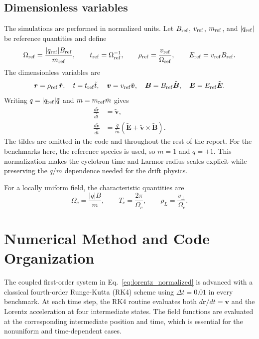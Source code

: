 \documentclass[11pt,a4paper]{article}
\newcommand{\vect}[1]{\boldsymbol{#1}}
\newcommand{\Ohm}{\Omega_c}
\newcommand{\rhL}{\rho_L}
\begin{document}
\subsection{Dimensionless variables}

The simulations are performed in normalized units. Let $B_{\rm ref}$, $v_{\rm ref}$, $m_{\rm ref}$, and $|q_{\rm ref}|$ be reference quantities and define
\begin{equation}
    \Omega_{\rm ref}=\frac{|q_{\rm ref}|B_{\rm ref}}{m_{\rm ref}},
    \qquad
    t_{\rm ref}=\Omega_{\rm ref}^{-1},
    \qquad
    \rho_{\rm ref}=\frac{v_{\rm ref}}{\Omega_{\rm ref}},
    \qquad
    E_{\rm ref}=v_{\rm ref}B_{\rm ref}.
\end{equation}
The dimensionless variables are
\begin{equation}
    \vect{r}=\rho_{\rm ref}\,\tilde{\vect{r}},\quad
    t=t_{\rm ref}\tilde t,\quad
    \vect{v}=v_{\rm ref}\tilde{\vect{v}},\quad
    \vect{B}=B_{\rm ref}\tilde{\vect{B}},\quad
    \vect{E}=E_{\rm ref}\tilde{\vect{E}}.
\end{equation}
Writing $q=|q_{\rm ref}|\tilde q$ and $m=m_{\rm ref}\tilde m$ gives
\begin{align}
    \frac{d\tilde{\vect{r}}}{d\tilde t} &= \tilde{\vect{v}},\\
    \frac{d\tilde{\vect{v}}}{d\tilde t}
    &=\frac{\tilde q}{\tilde m}
    \left(\tilde{\vect{E}}+\tilde{\vect{v}}\times\tilde{\vect{B}}\right).
    \label{eq:lorentz_normalized}
\end{align}
The tildes are omitted in the code and throughout the rest of the report. For the benchmarks here, the reference species is used, so $m=1$ and $q=+1$. This normalization makes the cyclotron time and Larmor-radius scales explicit while preserving the $q/m$ dependence needed for the drift physics.

For a locally uniform field, the characteristic quantities are
\begin{equation}
    \Ohm=\frac{|q|B}{m},
    \qquad
    T_c=\frac{2\pi}{\Ohm},
    \qquad
    \rhL=\frac{v_\perp}{\Ohm}.
\end{equation}

\section{Numerical Method and Code Organization}

The coupled first-order system in Eq.~\eqref{eq:lorentz_normalized} is advanced with a classical fourth-order Runge-Kutta (RK4) scheme using $\Delta t=0.01$ in every benchmark. At each time step, the RK4 routine evaluates both $d\vect{r}/dt=\vect{v}$ and the Lorentz acceleration at four intermediate states. The field functions are evaluated at the corresponding intermediate position and time, which is essential for the nonuniform and time-dependent cases.
\end{document}
